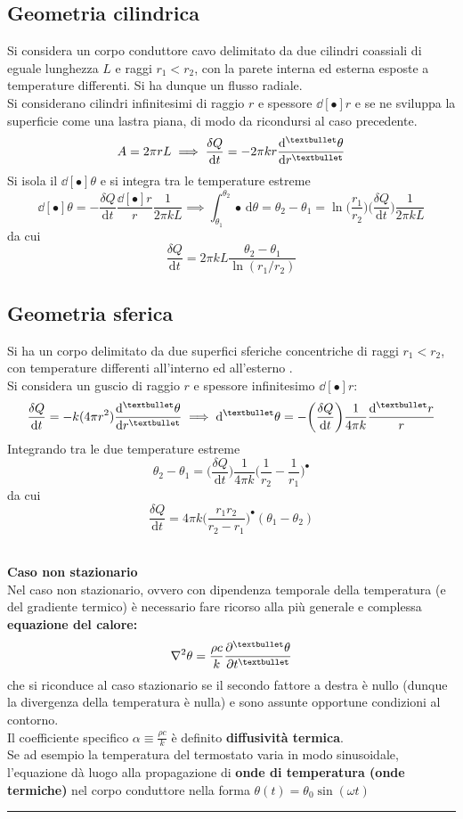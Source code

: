 \documentclass[10pt, oneside]{book}
\newcommand{\infobox}[2]{\vspace{0.5cm}~\\ \textbf{#1} \hrulefill \vspace{0.2cm}\\#2 {}\,\\\hrule \vspace{0.5cm}}
\newcommand{\ds}{\displaystyle}
\newcommand{\integral}[4]{\int_{#1}^{#2} #3 \, \mathrm{d}#4}
\begin{document}
\subsection{Geometria cilindrica}
Si considera un corpo conduttore cavo delimitato da due cilindri coassiali di eguale lunghezza $L$ e raggi $r_1 < r_2$, con la parete interna ed esterna esposte a temperature differenti. Si ha dunque un flusso radiale.\\
Si considerano cilindri infinitesimi di raggio $r$ e spessore $\dd[•]{r}$ e se ne sviluppa la superficie come una lastra piana, di modo da ricondursi al caso precedente.\\
\[A = 2 \pi r L \implies \frac{\delta Q}{\mathrm{d} t} = -2\pi k r \dv[•]{\theta}{r}\]
Si isola il $\dd[•]{\theta}$ e si integra tra le temperature estreme
\[\dd[•]{\theta} = - \frac{\delta Q}{\mathrm{d} t} \frac{\dd[•]{r}}{r} \frac{1}{2 \pi k L} \implies \integral{\theta_1}{\theta_2}{•}{\theta} = \theta_2 - \theta_1 = \ln \bigg( \frac{r_1}{r_2} \bigg) \bigg(\frac{\delta Q}{\mathrm{d} t}\bigg) \frac{1}{2 \pi k L}\]
da cui
\[\boxed{\frac{\delta Q}{\mathrm{d} t} = 2 \pi k L \frac{\theta_2 - \theta_1}{\ln (r_1 \big/ r_2)}}\]

\subsection{Geometria sferica}
Si ha un corpo delimitato da due superfici sferiche concentriche di raggi $r_1 < r_2$, con temperature differenti all'interno ed all'esterno .\\
Si considera un guscio di raggio $r$ e spessore infinitesimo $\dd[•]{r}$:
\[\frac{\delta Q}{\mathrm{d} t} = - k (4 \pi r^2) \dv[•]{\theta}{r} \implies \dd[•]{\theta}= - \bigg(\frac{\delta Q}{\mathrm{d} t}\bigg) \frac{1}{4 \pi k} \frac{\dd[•]{r}}{r}\]
Integrando tra le due temperature estreme
\[\theta_2 - \theta_1 = \bigg(\frac{\delta Q}{\mathrm{d} t}\bigg) \frac{1}{4 \pi k} \bigg(\frac{1}{r_2} - \frac{1}{r_1}\bigg)^{•}  \]
da cui
\[\boxed{\frac{\delta Q}{\mathrm{d} t} = 4 \pi k \bigg(\frac{r_1 r_2}{r_2 - r_1}\bigg)^{•} (\theta_1 - \theta_2)}\]

\infobox{Caso non stazionario}{Nel caso non stazionario, ovvero con dipendenza temporale della temperatura (e del gradiente termico) è necessario fare ricorso alla più generale e complessa \textbf{equazione del calore:}
\[\nabla^2 \theta = \frac{\rho c}{k} \pdv[•]{\theta}{t}\]
che si riconduce al caso stazionario se il secondo fattore a destra è nullo (dunque la divergenza della temperatura è nulla) e sono assunte opportune condizioni al contorno.\\
Il coefficiente specifico $\ds \alpha \equiv \frac{\rho c}{k}$ è definito \textbf{diffusività termica}.\\
Se ad esempio la temperatura del termostato varia in modo sinusoidale, l'equazione dà luogo alla propagazione di \textbf{onde di temperatura (onde termiche)} nel corpo conduttore nella forma $\ds \theta(t) = \theta_0 \sin (\omega t)$
}
\end{document}
